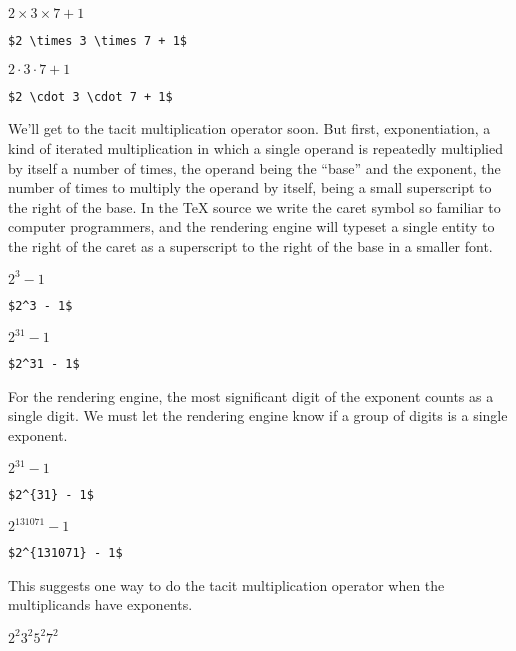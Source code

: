 \medskip

$2 \times 3 \times 7 + 1$

\smallskip

\verb=$2 \times 3 \times 7 + 1$=

\medskip

$2 \cdot 3 \cdot 7 + 1$

\smallskip

\verb=$2 \cdot 3 \cdot 7 + 1$=

\bigskip

We'll get to the tacit multiplication operator soon. But first, exponentiation, a kind of iterated multiplication in which a single operand is repeatedly multiplied by itself a number of times, the operand being the ``base'' and the exponent, the number of times to multiply the operand by itself, being a small superscript to the right of the base. In the \TeX{} source we write the caret symbol so familiar to computer programmers, and the rendering engine will typeset a single entity to the right of the caret as a superscript to the right of the base in a smaller font.

\medskip

$2^3 - 1$

\smallskip

\verb=$2^3 - 1$=

\medskip

$2^31 - 1$

\smallskip

\verb=$2^31 - 1$=

\bigskip

For the rendering engine, the most significant digit of the exponent counts as a single digit. We must let the rendering engine know if a group of digits is a single exponent.

\medskip

$2^{31} - 1$

\smallskip

\verb=$2^{31} - 1$=

\medskip

$2^{131071} - 1$

\smallskip

\verb=$2^{131071} - 1$=

\bigskip

This suggests one way to do the tacit multiplication operator when the multiplicands have exponents.

\medskip

$2^2 3^2 5^2 7^2$

\smallskip

